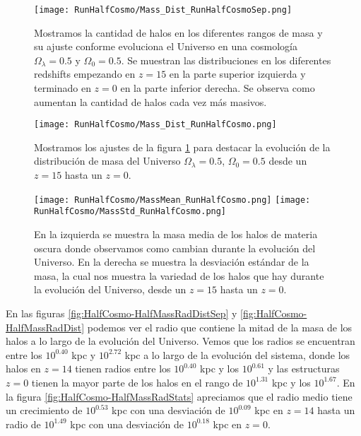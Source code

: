 \begin{figure}[H]
    \centering
    \texttt{[image: RunHalfCosmo/Mass\_Dist\_RunHalfCosmoSep.png]}
    \caption[Distribución de masa]{\footnotesize Mostramos la cantidad de halos en los diferentes rangos de masa y su ajuste conforme evoluciona el Universo en una cosmología $\Omega_\lambda = 0.5 $ y $\Omega_0 = 0.5$. Se muestran las distribuciones en los diferentes redshifts empezando en $z=15$ en la parte superior izquierda y terminado en $z=0$ en la parte inferior derecha. Se observa como aumentan la cantidad de halos cada vez más masivos.}
    \label{fig:HalfCosmo-MassDistSep}
\end{figure}

\begin{figure}[H]
    \centering
    \texttt{[image: RunHalfCosmo/Mass\_Dist\_RunHalfCosmo.png]}
    \caption[Comparación de distribución de masa Universo]{\footnotesize Mostramos los ajustes de la figura \ref{fig:HalfCosmo-MassDistSep} para destacar la evolución de la distribución de masa del Universo $\Omega_\lambda = 0.5$, $\Omega_0 = 0.5$ desde un $z=15$ hasta un $z=0$.}
    \label{fig:HalfCosmo-MassDist}
\end{figure}

\begin{figure}[H]
    \centering
    \texttt{[image: RunHalfCosmo/MassMean\_RunHalfCosmo.png]}
    \texttt{[image: RunHalfCosmo/MassStd\_RunHalfCosmo.png]}
    \caption[Media y desviación estándar de la distribución de masa]{\footnotesize En la izquierda se muestra la masa media de los halos de materia oscura donde observamos como cambian durante la evolución del Universo. En la derecha se muestra la desviación estándar de la masa, la cual nos muestra la variedad de los halos que hay durante la evolución del Universo, desde un $z=15$ hasta un $z=0$.}
    \label{fig:HalfCosmo-MassStats}
\end{figure}

En las figuras \ref{fig:HalfCosmo-HalfMassRadDistSep} y \ref{fig:HalfCosmo-HalfMassRadDist} podemos ver el radio que contiene la mitad de la masa de los halos a lo largo de la evolución del Universo. Vemos que los radios se encuentran entre los $10^{0.40}$ kpc y $10^{2.72}$ kpc a lo largo de la evolución del sistema, donde los halos en $z=14$ tienen radios entre los $10^{0.40}$ kpc y los $10^{0.61}$ y las estructuras $z=0$ tienen la mayor parte de los halos en el rango de $10^{1.31}$ kpc y los $10^{1.67}$. En la figura \ref{fig:HalfCosmo-HalfMassRadStats} apreciamos que el radio medio tiene un crecimiento de $10^{0.53}$ kpc con una desviación de $10^{0.09}$ kpc en $z=14$ hasta un radio de $10^{1.49}$ kpc con una desviación de $10^{0.18}$ kpc en $z=0$.

